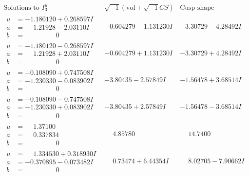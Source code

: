 \documentclass[1p]{elsarticle_modified}
\theoremstyle{definition}
\newcommand{\I}{\sqrt{-1}}
\begin{document}
$$\begin{array}{c|c|c}  
\text{Solutions to }I^u_{3}& \I (\text{vol} + \sqrt{-1}CS) & \text{Cusp shape}\\
 \hline 
\begin{aligned}
u &= -1.180120 + 0.268597 I \\
a &= \phantom{-}1.21928 - 2.03110 I \\
b &= \phantom{-0.000000 } 0\end{aligned}
 & -0.604279 - 1.131230 I & -3.30729 - 4.28492 I \\ \hline\begin{aligned}
u &= -1.180120 - 0.268597 I \\
a &= \phantom{-}1.21928 + 2.03110 I \\
b &= \phantom{-0.000000 } 0\end{aligned}
 & -0.604279 + 1.131230 I & -3.30729 + 4.28492 I \\ \hline\begin{aligned}
u &= -0.108090 + 0.747508 I \\
a &= -1.230330 - 0.083902 I \\
b &= \phantom{-0.000000 } 0\end{aligned}
 & -3.80435 - 2.57849 I & -1.56478 + 3.68514 I \\ \hline\begin{aligned}
u &= -0.108090 - 0.747508 I \\
a &= -1.230330 + 0.083902 I \\
b &= \phantom{-0.000000 } 0\end{aligned}
 & -3.80435 + 2.57849 I & -1.56478 - 3.68514 I \\ \hline\begin{aligned}
u &= \phantom{-}1.37100\phantom{ +0.000000I} \\
a &= \phantom{-}0.337834\phantom{ +0.000000I} \\
b &= \phantom{-0.000000 } 0\end{aligned}
 & \phantom{-}4.85780\phantom{ +0.000000I} & \phantom{-}14.7400\phantom{ +0.000000I} \\ \hline\begin{aligned}
u &= \phantom{-}1.334530 + 0.318930 I \\
a &= -0.370895 - 0.073482 I \\
b &= \phantom{-0.000000 } 0\end{aligned}
 & \phantom{-}0.73474 + 6.44354 I & \phantom{-}8.02705 - 7.90662 I \\ \hline\begin{aligned}

\end{aligned}
\end{array}$$
\end{document}
